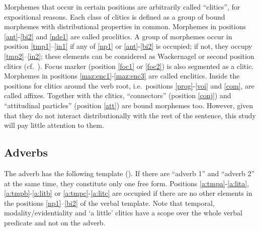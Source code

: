 \documentclass[output=paper]{langscibook}
\begin{document}
Morphemes that occur in certain positions are arbitrarily called ``clitics'', for expositional reasons. Each class of clitics is defined as a group of bound morphemes with distributional properties in common. Morphemes in positions \ref{ant}-\ref{bi2} and \ref{nde1} are called proclitics. A group of morphemes occur in position \ref{tmp1}–\ref{in1} if any of \ref{np1} or \ref{ant}-\ref{bi2} is occupied; if not, they occupy \ref{tmp2}–\ref{in2}; these elements can be considered as Wackernagel or second position clitics (cf.~\citealt{2p20}). Focus marker (position \ref{foc1} or \ref{foc2}) is also segmented as a clitic. Morphemes in positions \ref{maz:enc1}-\ref{maz:enc3} are called enclitics. Inside the positions for clitics around the verb root, i.e.~positions \ref{prog}-\ref{voi} and \ref{com}, are called affixes. Together with the clitics, ``connectors'' (position \ref{conj}) and ``attitudinal particles'' (position \ref{att}) are bound morphemes too. However, given that they do not interact distributionally with the rest of the sentence, this study will pay little attention to them. 


\subsection{Adverbs}\label{sec-ext1}
The adverb has the following template (). If there are ``adverb 1'' and  ``adverb 2'' at the same time, they constitute only one free form.
Positions \ref{a:tmpa}-\ref{a:lita}, \ref{a:tmpb}-\ref{a:litb} or \ref{a:tmpc}-\ref{a:litc} are occupied if there are no other elements in the positions \ref{np1}–\ref{bi2} of the verbal template. Note that temporal, modality/evidentiality and `a little' clitics have a scope over the whole verbal predicate and not on the adverb.
\end{document}
